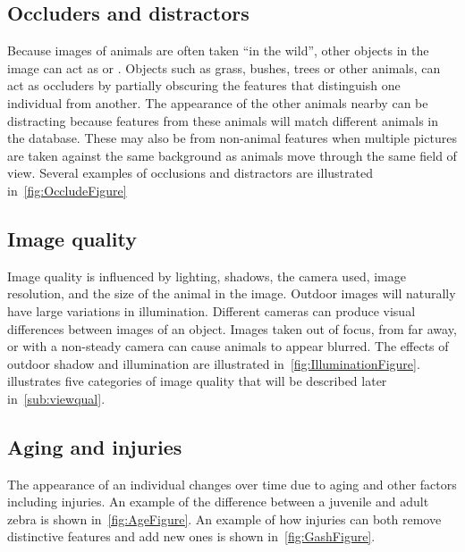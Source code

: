         \BacksFigure{}

        \ThreeSixtyFigure{}

        \PoseFigure{}

    \subsection{Occluders and distractors}
        Because images of animals are often taken ``in the wild'', other objects in the image can act as
         or . Objects such as grass, bushes, trees or other animals, can act
        as occluders by partially obscuring the features that distinguish one individual from another. The appearance of
        the other animals nearby can be distracting because features from these animals will match different animals in
        the database. These  may also be from non-animal features when multiple pictures are
        taken against the same background as animals move through the same field of view. Several examples of occlusions
        and distractors are illustrated in~\cref{fig:OccludeFigure}

        \OccludeFigure{}

    \subsection{Image quality}
        Image quality is influenced by lighting, shadows, the camera used, image resolution, and the size of the animal
        in the image. Outdoor images will naturally have large variations in illumination. Different cameras can produce
        visual differences between images of an object. Images taken out of focus, from far away, or with a non-steady
        camera can cause animals to appear blurred. The effects of outdoor shadow and illumination are illustrated
        in~\cref{fig:IlluminationFigure}.  illustrates five categories of image quality that
        will be described later in~\cref{sub:viewqual}.

        \IlluminationFigure{}

        \QualityFigure{}

    \subsection{Aging and injuries}
        The appearance of an individual changes over time due to aging and other factors including injuries. An example
        of the difference between a juvenile and adult zebra is shown in~\cref{fig:AgeFigure}. An example of how
        injuries can both remove distinctive features and add new ones is shown in~\cref{fig:GashFigure}.

